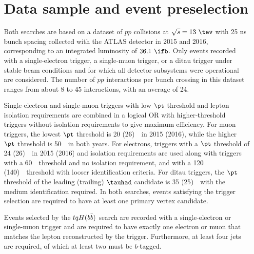 \section{Data sample and event preselection}
\label{sec:data_presel}

Both searches are based on a dataset of $pp$ collisions at $\sqrt{s}=13~\tev$ with 25 ns bunch spacing collected 
with the ATLAS detector in 2015 and 2016, corresponding to an integrated luminosity of $36.1~\ifb$.
Only events recorded with a single-electron trigger, a single-muon trigger, or a ditau trigger under stable beam conditions 
and for which all detector subsystems were operational are considered.
The number of $pp$ interactions per bunch crossing in this dataset ranges from about 8 to 45 interactions, with an average of 24.

Single-electron and single-muon triggers with low $\pt$ threshold and lepton isolation requirements are combined in a logical OR 
with higher-threshold triggers without isolation requirements to give maximum efficiency. 
For muon triggers, the lowest $\pt$ threshold is 20 (26)~\gev\ in 2015 (2016), while the higher $\pt$ threshold is 50~\gev\ in both years. 
For electrons, triggers with a $\pt$ threshold of 24 (26)~\gev\ in 2015 (2016) and isolation requirements are used
along with triggers with a 60~\gev\ threshold and no isolation requirement, and with a 120 (140)~\gev\ threshold with looser identification criteria.
For ditau triggers, the $\pt$ threshold of the leading (trailing) $\tauhad$ candidate is 35 (25)~\gev\ with the medium identification required.
In both searches, events satisfying the trigger selection are required to have at least one primary vertex candidate.

Events selected by the $tqH(b\bar{b})$ search are recorded with a single-electron or single-muon trigger and 
are required to have exactly one electron or muon that matches the lepton reconstructed by the trigger.  
Furthermore, at least four jets are required, of which at least two must be $b$-tagged.

